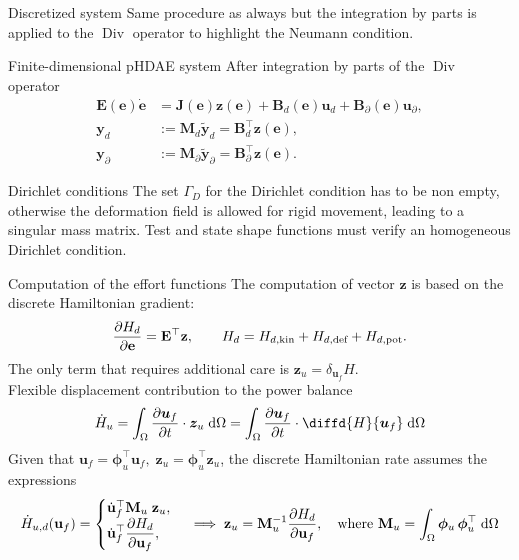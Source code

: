 \documentclass[aspectratio=169]{ISAE-Beamer}
\DeclareMathOperator*{\Div}{Div}
\begin{document}
\begin{frame}{Discretized system}
	Same procedure as always but the integration by parts is applied to the $\Div$ operator to highlight the Neumann condition.
	\begin{exampleblock}{Finite-dimensional pHDAE system}
		\setlength{\abovedisplayskip}{3pt}
		\setlength{\belowdisplayskip}{3pt}
		After integration by parts of the $\Div$ operator
		\begin{equation*}
		\begin{aligned}
		\mathbf{E}(\mathbf{e}) \dot{\mathbf{e}} &= \mathbf{J}(\mathbf{e}) \mathbf{z}(\mathbf{e}) + \mathbf{B}_d(\mathbf{e}) \mathbf{u}_d + \mathbf{B}_\partial(\mathbf{e}) \mathbf{u}_\partial, \\
		\mathbf{y}_d &:= \mathbf{M}_d \widetilde{\mathbf{y}}_d = \mathbf{B}_d^\top \mathbf{z}(\mathbf{e}),  \\
		\mathbf{y}_\partial &:= \mathbf{M}_\partial \widetilde{\mathbf{y}}_\partial = \mathbf{B}_\partial^\top \mathbf{z}(\mathbf{e}).
		\end{aligned}
		\end{equation*}
	\end{exampleblock}
	
	\begin{block}{Dirichlet conditions}
		The set $\Gamma_D$ for the Dirichlet condition has to be non empty, otherwise the deformation field is allowed for rigid movement, leading to a singular mass matrix. Test and state shape functions must verify an homogeneous Dirichlet condition. 
	\end{block}
\end{frame}

\begin{frame}{Computation of the effort functions}
The computation of vector $\mathbf{z}$ is based on the discrete Hamiltonian  gradient:
\[
\diffp{H_d}{\mathbf{e}} = \mathbf{E}^\top \mathbf{z}, \qquad H_d = H_{d, \text{kin}}+H_{d, \text{def}}+H_{d, \text{pot}}.
\]
	The only term that requires additional care is $\bm{z}_{u}=\delta_{\bm{u}_f} H$.  \\
	Flexible displacement contribution to the power balance
	\[
	\dot{H}_u = \int_{\Omega} \diffp{\bm{u}_f}{t} \cdot \bm{z}_{u} \d{\Omega} = \int_{\Omega} \diffp{\bm{u}_f}{t} \cdot \diffd{H}{\bm{u}_f} \d{\Omega}
	\]
	Given that $\bm{u}_f = \bm{\phi}_u^\top \mathbf{u}_f, \; \bm{z}_u = \bm{\phi}_u^\top \mathbf{z}_u$, the discrete Hamiltonian rate assumes the expressions
	\begin{equation*}
	\dot{H}_{u, d}(\mathbf{u}_f) = 
	\begin{cases}
	\dot{\mathbf{u}}_f^\top \mathbf{M}_u \; \mathbf{z}_u, \\
	\displaystyle \dot{\mathbf{u}}_f^\top \diffp{H_d}{\mathbf{u}_f},
	\end{cases} \implies \mathbf{z}_u = \mathbf{M}_u^{-1} \diffp{H_d}{\mathbf{u}_f}, \quad \text{where } \mathbf{M}_u=\int_{\Omega} \bm{\phi}_u \, \bm{\phi}_u^\top \d{\Omega}
	\end{equation*}
	
\end{frame}
\end{document}
